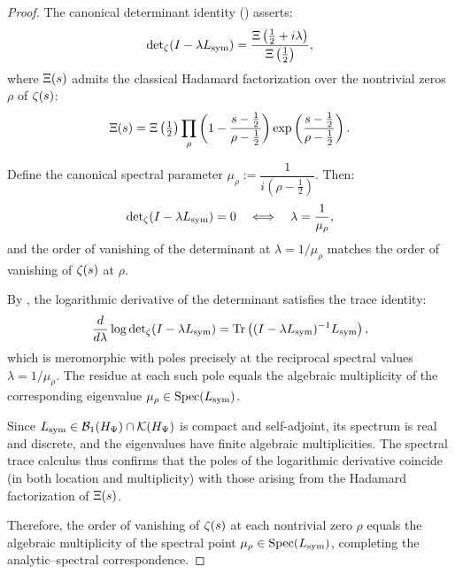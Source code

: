 \begin{proof}
The canonical determinant identity () asserts:
\[
\det\nolimits_{\zeta}(I - \lambda L_{\mathrm{sym}})
= \frac{\Xi\left(\tfrac{1}{2} + i\lambda\right)}{\Xi\left(\tfrac{1}{2}\right)},
\]
where \( \Xi(s) \) admits the classical Hadamard factorization over the nontrivial zeros \( \rho \) of \( \zeta(s) \):
\[
\Xi(s) = \Xi\left(\tfrac{1}{2}\right)
\prod_\rho \left(1 - \frac{s - \tfrac{1}{2}}{\rho - \tfrac{1}{2}}\right)
\exp\left( \frac{s - \tfrac{1}{2}}{\rho - \tfrac{1}{2}} \right).
\]

\medskip

Define the canonical spectral parameter \( \mu_\rho := \dfrac{1}{i(\rho - \tfrac{1}{2})} \). Then:
\[
\det\nolimits_\zeta(I - \lambda L_{\mathrm{sym}}) = 0 \quad \Longleftrightarrow \quad \lambda = \frac{1}{\mu_\rho},
\]
and the order of vanishing of the determinant at \( \lambda = 1/\mu_\rho \) matches the order of vanishing of \( \zeta(s) \) at \( \rho \).

\medskip

By , the logarithmic derivative of the determinant satisfies the trace identity:
\[
\frac{d}{d\lambda} \log \det\nolimits_\zeta(I - \lambda L_{\mathrm{sym}})
= \operatorname{Tr}\left( (I - \lambda L_{\mathrm{sym}})^{-1} L_{\mathrm{sym}} \right),
\]
which is meromorphic with poles precisely at the reciprocal spectral values \( \lambda = 1/\mu_\rho \). The residue at each such pole equals the algebraic multiplicity of the corresponding eigenvalue \( \mu_\rho \in \operatorname{Spec}(L_{\mathrm{sym}}) \).

\medskip

Since \( L_{\mathrm{sym}} \in \mathcal{B}_1(H_{\Psi}) \cap \mathcal{K}(H_{\Psi}) \) is compact and self-adjoint, its spectrum is real and discrete, and the eigenvalues have finite algebraic multiplicities. The spectral trace calculus thus confirms that the poles of the logarithmic derivative coincide (in both location and multiplicity) with those arising from the Hadamard factorization of \( \Xi(s) \).

\medskip

Therefore, the order of vanishing of \( \zeta(s) \) at each nontrivial zero \( \rho \) equals the algebraic multiplicity of the spectral point \( \mu_\rho \in \operatorname{Spec}(L_{\mathrm{sym}}) \), completing the analytic–spectral correspondence.
\end{proof}
